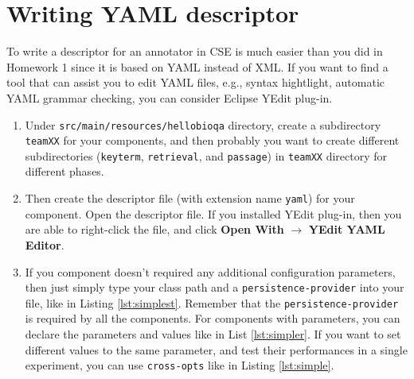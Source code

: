 
\section{Writing YAML descriptor}

To write a descriptor for an annotator in CSE is much easier than you did in
Homework 1 since it is based on YAML instead of XML. If you want to find a tool
that can assist you to edit YAML files, e.g., syntax hightlight, automatic YAML
grammar checking, you can consider Eclipse YEdit plug-in.

\begin{enumerate}

\item Under \texttt{src/main/resources/hellobioqa} directory, create a
subdirectory \texttt{teamXX} for your components, and then probably you want to
create different subdirectories (\texttt{keyterm}, \texttt{retrieval}, and
\texttt{passage}) in \texttt{teamXX} directory for different phases.

\item Then create the descriptor file (with extension name \texttt{yaml}) for
your component. Open the descriptor file. If you installed YEdit plug-in, then you are
able to right-click the file, and click \textbf{Open With} $\rightarrow$
\textbf{YEdit YAML Editor}.

\item If you component doesn't required any additional configuration parameters,
then just simply type your class path and a \verb|persistence-provider| into
your file, like in Listing \ref{lst:simplest}. Remember that the
\verb|persistence-provider| is required by all the components. For components
with parameters, you can declare the parameters and values like in List
\ref{lst:simpler}. If you want to set different values to the same parameter,
and test their performances in a single experiment, you can use
\verb|cross-opts| like in Listing \ref{lst:simple}.








\end{enumerate}
